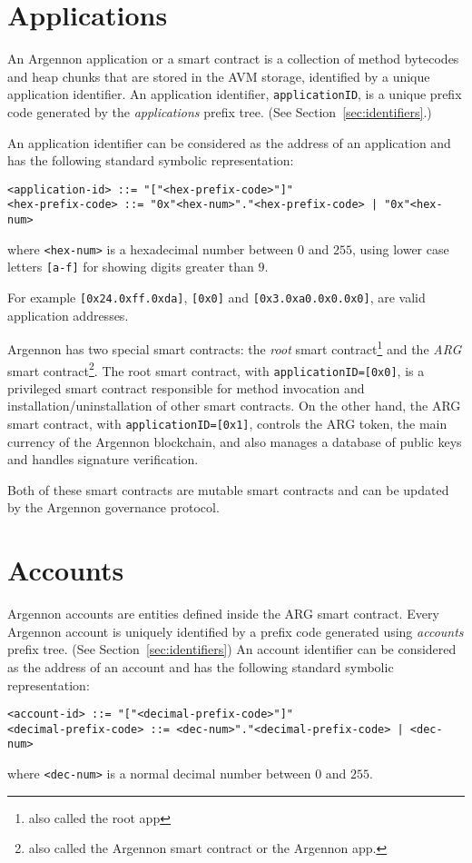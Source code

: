 
\section{Applications}\label{sec:applications}

An Argennon application or a smart contract is a collection of method bytecodes and heap chunks that are stored in
the AVM storage, identified by a unique application identifier. An application identifier, \texttt{applicationID}, is
a unique prefix code generated by the \emph{applications} prefix tree. (See Section~\ref{sec:identifiers}.)

An application identifier can
be considered as the address of an application and has the following standard symbolic representation:
\begin{verbatim}
<application-id> ::= "["<hex-prefix-code>"]"
<hex-prefix-code> ::= "0x"<hex-num>"."<hex-prefix-code> | "0x"<hex-num>
\end{verbatim}
where \texttt{<hex-num>} is a hexadecimal number between $0$ and $255$, using lower case
letters \texttt{[a-f]} for showing digits greater than $9$.

For example \texttt{[0x24.0xff.0xda]}, \texttt{[0x0]} and \texttt{[0x3.0xa0.0x0.0x0]}, are valid application addresses.

Argennon has two special smart contracts: the \emph{root} smart contract\footnote{also called the root app} and
the \emph{ARG} smart contract\footnote{also called the Argennon smart contract or the Argennon app.}.
The root smart contract, with \texttt{applicationID=[0x0]}, is a privileged smart contract responsible for
method invocation and installation/uninstallation of other smart contracts.
On the other hand, the ARG smart contract, with \texttt{applicationID=[0x1]}, controls the ARG token, the main
currency of the Argennon blockchain, and also manages a database of public keys and handles signature verification.

Both of these smart contracts are mutable smart contracts and can be updated by the Argennon governance protocol.


\section{Accounts}\label{sec:accounts}

Argennon accounts are entities defined inside the ARG smart contract.
Every Argennon account is uniquely identified by a prefix code generated using \emph{accounts} prefix
tree. (See Section~\ref{sec:identifiers}) An account
identifier can be considered as the address of an account and has the following standard symbolic representation:
\begin{verbatim}
<account-id> ::= "["<decimal-prefix-code>"]"
<decimal-prefix-code> ::= <dec-num>"."<decimal-prefix-code> | <dec-num>
\end{verbatim}
where \texttt{<dec-num>} is a normal decimal number between $0$ and $255$.

